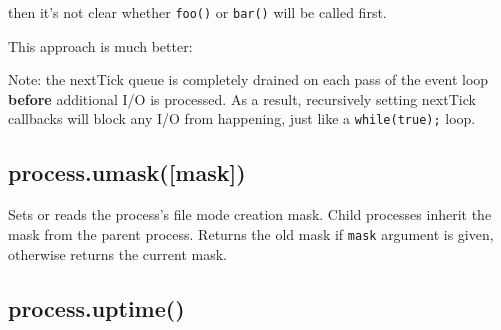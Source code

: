 then it's not clear whether \texttt{foo()} or \texttt{bar()} will be
called first.

This approach is much better:

\begin{Shaded}
\begin{Highlighting}[]
 
   
    \NormalTok{;}
  \NormalTok{\}}

  \NormalTok{(}
\NormalTok{\}}
\end{Highlighting}
\end{Shaded}

Note: the nextTick queue is completely drained on each pass of the event
loop \textbf{before} additional I/O is processed. As a result,
recursively setting nextTick callbacks will block any I/O from
happening, just like a \texttt{while(true);} loop.

\subsection{process.umask({[}mask{]})}\label{process.umaskmask}

Sets or reads the process's file mode creation mask. Child processes
inherit the mask from the parent process. Returns the old mask if
\texttt{mask} argument is given, otherwise returns the current mask.

\begin{Shaded}
\begin{Highlighting}[]
 \NormalTok{;}

\NormalTok{(} \NormalTok{+ }\NormalTok{(}\NormalTok{) +}
             \NormalTok{+ }\NormalTok{(}\NormalTok{));}
\end{Highlighting}
\end{Shaded}

\subsection{process.uptime()}\label{process.uptime}

